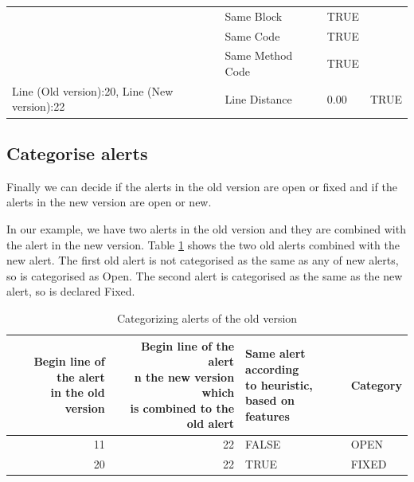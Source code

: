 \documentclass[
]{article}
\begin{document}
\begin{table}[H]
\begin{tabular}[t]{l|l|l|l}
\rowcolor{gray!6}   & Same Block & TRUE & \\

 & Same Code & TRUE & \\

\rowcolor{gray!6}   & Same Method Code & TRUE & \\

\multirow[t]{-8}{*}{\raggedright\arraybackslash Line (Old version):20, Line (New version):22} & Line Distance & 0.00 & \multirow[t]{-8}{*}{\raggedright\arraybackslash TRUE}\\
\hline
\end{tabular}
\end{table}

\normalsize

\subsection{Categorise alerts}\label{heuristic}

Finally we can decide if the alerts in the old version are open or fixed
and if the alerts in the new version are open or new.

In our example, we have two alerts in the old version and they are
combined with the alert in the new version. Table
\ref{tab_categorizing_old} shows the two old alerts combined with the
new alert. The first old alert is not categorised as the same as any of
new alerts, so is categorised as Open. The second alert is categorised
as the same as the new alert, so is declared Fixed.

\small

\begin{table}[H]

\caption{\label{tab:unnamed-chunk-15}Categorizing alerts of the old version \label{tab_categorizing_old} }
\centering
\begin{tabular}[t]{r|r|l|l}
\hline
\makecell[l]{Begin line of the alert\\in the old version} & \makecell[l]{Begin line of the alert\\n the new version which\\is combined to the old alert} & \makecell[l]{Same alert according\\to heuristic,\\ based on features} & Category\\
\hline
\rowcolor{gray!6}  11 & 22 & FALSE & OPEN\\
\cline{1-4}
20 & 22 & TRUE & FIXED\\
\hline
\end{tabular}
\end{table}
\end{document}
